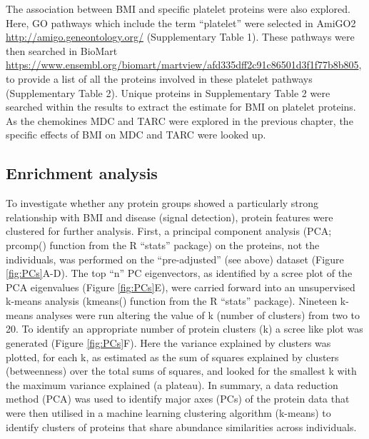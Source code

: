 \documentclass[11pt,twoside]{bristolthesis}
\begin{document}
The association between BMI and specific platelet proteins were also explored. Here, GO pathways which include the term ``platelet'' were selected in AmiGO2 \url{http://amigo.geneontology.org/} (Supplementary Table 1). These pathways were then searched in BioMart \url{https://www.ensembl.org/biomart/martview/afd335dff2c91c86501d3f1f77b8b805}, to provide a list of all the proteins involved in these platelet pathways (Supplementary Table 2). Unique proteins in Supplementary Table 2 were searched within the results to extract the estimate for BMI on platelet proteins. As the chemokines MDC and TARC were explored in the previous chapter, the specific effects of BMI on MDC and TARC were looked up.

\hypertarget{enrichment-analysis}{%
\subsection{Enrichment analysis}\label{enrichment-analysis}}

To investigate whether any protein groups showed a particularly strong relationship with BMI and disease (signal detection), protein features were clustered for further analysis. First, a principal component analysis (PCA; prcomp() function from the R ``stats'' package) on the proteins, not the individuals, was performed on the ``pre-adjusted'' (see above) dataset (Figure \ref{fig:PCs}A-D). The top ``n'' PC eigenvectors, as identified by a scree plot of the PCA eigenvalues (Figure \ref{fig:PCs}E), were carried forward into an unsupervised k-means analysis (kmeans() function from the R ``stats'' package). Nineteen k-means analyses were run altering the value of k (number of clusters) from two to 20. To identify an appropriate number of protein clusters (k) a scree like plot was generated (Figure \ref{fig:PCs}F). Here the variance explained by clusters was plotted, for each k, as estimated as the sum of squares explained by clusters (betweenness) over the total sums of squares, and looked for the smallest k with the maximum variance explained (a plateau). In summary, a data reduction method (PCA) was used to identify major axes (PCs) of the protein data that were then utilised in a machine learning clustering algorithm (k-means) to identify clusters of proteins that share abundance similarities across individuals.
\end{document}
